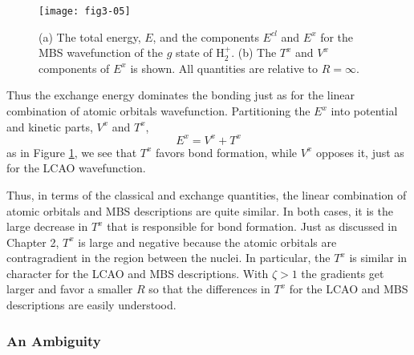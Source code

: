 \begin{figure}
\texttt{[image: fig3-05]}
\caption{(a) The total energy, $E$, and the 
components $E^{cl}$ and $E^x$ for the MBS wavefunction
of the $g$ state of H$^+_2$. (b) The $T^x$ and $V^x$ components of
$E^x$ is shown.  All quantities are relative to $R = \infty$.}
\label{fig3-06}
\end{figure}

\noindent
Thus the exchange energy dominates the bonding just as for the linear 
combination of atomic orbitals wavefunction. Partitioning the $E^x$ 
into potential and kinetic parts, $V^x$ and $T^x$,
\begin{equation}
E^x = V^x + T^x
\end{equation}
as in Figure \ref{fig3-06}, we see that $T^x$ favors bond formation,
while $V^x$ opposes it, just as for the LCAO wavefunction.

Thus, in terms of the classical and exchange quantities, the linear
combination of atomic orbitals and MBS descriptions are quite
similar. In both cases, it is the large decrease in $T^x$ that is
responsible for bond formation. Just as discussed in Chapter 2, $T^x$
is large and negative because the atomic orbitals are contragradient
in the region between the nuclei. In particular, the $T^x$ is similar
in character for the LCAO and MBS descriptions.  With $\zeta > 1$ the
gradients get larger and favor a smaller $R$ so that the differences
in $T^x$ for the LCAO and MBS
descriptions are easily understood.

\subsubsection{An Ambiguity}

